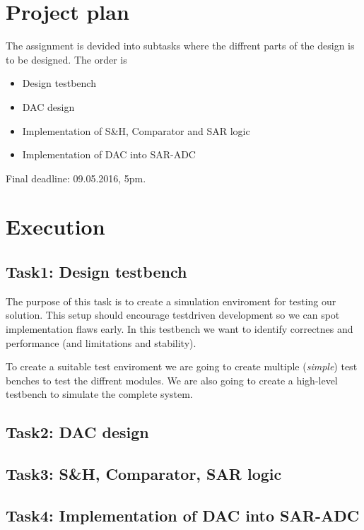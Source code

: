 \documentclass[english, 12pt, a4paper]{ifimaster}
\begin{document}
\section*{Project plan}
The assignment is devided into subtasks where the diffrent parts of the design is to be designed.
The order is 
\begin{itemize}
 \item Design testbench
 \item DAC design
 \item Implementation of S\&H, Comparator and SAR logic
 \item Implementation of DAC into SAR-ADC
\end{itemize}

Final deadline: 09.05.2016, 5pm.

\section*{Execution}
\subsection*{Task1: Design testbench}
The purpose of this task is to create a simulation enviroment for testing our solution. This setup should encourage testdriven development so we can spot implementation flaws early.
In this testbench we want to identify correctnes and performance (and limitations and stability).

To create a suitable test enviroment we are going to create multiple (\textit{simple}) test benches to test the diffrent modules.
We are also going to create a high-level testbench to simulate the complete system.

\subsection*{Task2: DAC design}


\subsection*{Task3: S\&H, Comparator, SAR logic}


\subsection*{Task4: Implementation of DAC into SAR-ADC}
\end{document}
